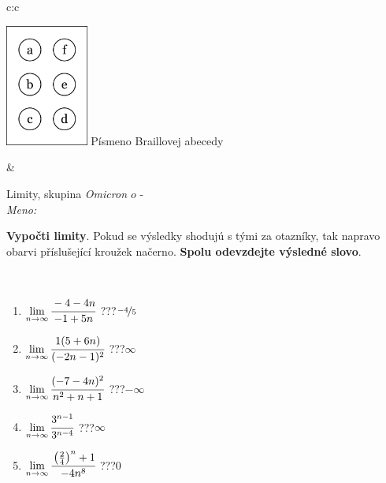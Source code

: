 \documentclass[10pt]{report}
\newcommand\omicron{o}
\begin{document}
\begin{tabular}{c:c}
\begin{minipage}[c][104.5mm][t]{0.5\linewidth}
\begin{center}
\begin{minipage}{0.20\linewidth}
\begin{center}
\includegraphics[height=40mm]{../images/braille.png}
{\small Písmeno Braillovej abecedy}
\end{center}
\end{minipage}
\end{center}
\end{minipage}
&
\begin{minipage}[c][104.5mm][t]{0.5\linewidth}
\begin{center}
\vspace{7mm}
{\huge Limity, skupina \textit{Omicron $\omicron$} -}\\[5mm]
\textit{Meno:}\phantom{xxxxxxxxxxxxxxxxxxxxxxxxxxxxxxxxxxxxxxxxxxxxxxxxxxxxxxxxxxxxxxxxx}\\[5mm]
\begin{minipage}{0.95\linewidth}
\begin{center}
\textbf{Vypočti limity}. Pokud se výsledky shodujú s tými za otazníky, tak napravo\\obarvi příslušející kroužek načerno. \textbf{Spolu odevzdejte výsledné slovo}.
\end{center}
\end{minipage}
\\[1mm]
\begin{minipage}{0.79\linewidth}
\begin{center}
\begin{varwidth}{\linewidth}
\begin{enumerate}
\normalsize
\item $\lim\limits_{n\to\infty}\cfrac{-4-4n}{-1+5n}$\quad \dotfill\; ???\;\dotfill \quad $\nicefrac{-4}{5}$
\item $\lim\limits_{n\to\infty}\cfrac{1(5+6n)}{(-2n-1)^2}$\quad \dotfill\; ???\;\dotfill \quad $\infty$
\item $\lim\limits_{n\to\infty}\cfrac{(-7-4n)^2}{n^2+n+1}$\quad \dotfill\; ???\;\dotfill \quad $-\infty$
\item $\lim\limits_{n\to\infty}\cfrac{3^{n-1}}{3^{n-4}}$\quad \dotfill\; ???\;\dotfill \quad $\infty$
\item $\lim\limits_{n\to\infty}\cfrac{\left(\frac{2}{4}\right)^n +1}{-4n^{8}}$\quad \dotfill\; ???\;\dotfill \quad $0$

\end{enumerate}
\end{varwidth}
\end{center}
\end{minipage}
\end{center}
\end{minipage}
\end{tabular}
\end{document}
